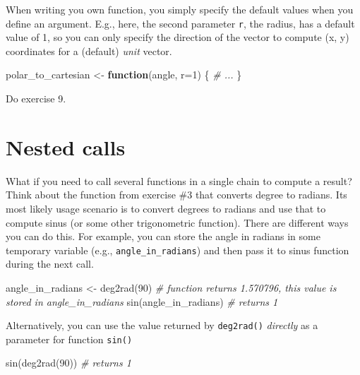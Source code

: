 \documentclass[
]{book}
\newenvironment{Shaded}{\begin{snugshade}}{\end{snugshade}}
\newcommand{\AttributeTok}[1]{\textcolor[rgb]{0.77,0.63,0.00}{#1}}
\newcommand{\CommentTok}[1]{\textcolor[rgb]{0.56,0.35,0.01}{\textit{#1}}}
\newcommand{\ControlFlowTok}[1]{\textcolor[rgb]{0.13,0.29,0.53}{\textbf{#1}}}
\newcommand{\DecValTok}[1]{\textcolor[rgb]{0.00,0.00,0.81}{#1}}
\newcommand{\FunctionTok}[1]{\textcolor[rgb]{0.00,0.00,0.00}{#1}}
\newcommand{\NormalTok}[1]{#1}
\newcommand{\OtherTok}[1]{\textcolor[rgb]{0.56,0.35,0.01}{#1}}
\begin{document}
When writing you own function, you simply specify the default values when you define an argument. E.g., here, the second parameter \texttt{r}, the radius, has a default value of 1, so you can only specify the direction of the vector to compute (x, y) coordinates for a (default) \emph{unit} vector.

\begin{Shaded}
\begin{Highlighting}[]
\NormalTok{polar\_to\_cartesian }\OtherTok{\textless{}{-}} \ControlFlowTok{function}\NormalTok{(angle, }\AttributeTok{r=}\DecValTok{1}\NormalTok{) \{}
  \CommentTok{\# ...}
\NormalTok{\}}
\end{Highlighting}
\end{Shaded}

Do exercise 9.

\hypertarget{nested-calls}{%
\section{Nested calls}\label{nested-calls}}

What if you need to call several functions in a single chain to compute a result? Think about the function from exercise \#3 that converts degree to radians. Its most likely usage scenario is to convert degrees to radians and use that to compute sinus (or some other trigonometric function). There are different ways you can do this. For example, you can store the angle in radians in some temporary variable (e.g., \texttt{angle\_in\_radians}) and then pass it to sinus function during the next call.

\begin{Shaded}
\begin{Highlighting}[]
\NormalTok{angle\_in\_radians }\OtherTok{\textless{}{-}} \FunctionTok{deg2rad}\NormalTok{(}\DecValTok{90}\NormalTok{) }\CommentTok{\# function returns 1.570796, this value is stored in angle\_in\_radians}
\FunctionTok{sin}\NormalTok{(angle\_in\_radians) }\CommentTok{\# returns 1}
\end{Highlighting}
\end{Shaded}

Alternatively, you can use the value returned by \texttt{deg2rad()} \emph{directly} as a parameter for function \texttt{sin()}

\begin{Shaded}
\begin{Highlighting}[]
\FunctionTok{sin}\NormalTok{(}\FunctionTok{deg2rad}\NormalTok{(}\DecValTok{90}\NormalTok{)) }\CommentTok{\# returns 1}
\end{Highlighting}
\end{Shaded}
\end{document}
